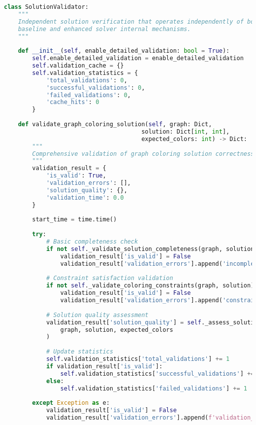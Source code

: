\begin{lstlisting}[language=Python, caption=External Constraint Satisfaction Verification System]
class SolutionValidator:
    """
    Independent solution verification that operates independently of both 
    baseline and enhanced solver internal mechanisms.
    """
    
    def __init__(self, enable_detailed_validation: bool = True):
        self.enable_detailed_validation = enable_detailed_validation
        self.validation_cache = {}
        self.validation_statistics = {
            'total_validations': 0,
            'successful_validations': 0,
            'failed_validations': 0,
            'cache_hits': 0
        }
    
    def validate_graph_coloring_solution(self, graph: Dict, 
                                       solution: Dict[int, int],
                                       expected_colors: int) -> Dict:
        """
        Comprehensive validation of graph coloring solution correctness.
        """
        validation_result = {
            'is_valid': True,
            'validation_errors': [],
            'solution_quality': {},
            'validation_time': 0.0
        }
        
        start_time = time.time()
        
        try:
            # Basic completeness check
            if not self._validate_solution_completeness(graph, solution):
                validation_result['is_valid'] = False
                validation_result['validation_errors'].append('incomplete_solution')
            
            # Constraint satisfaction validation
            if not self._validate_coloring_constraints(graph, solution):
                validation_result['is_valid'] = False
                validation_result['validation_errors'].append('constraint_violation')
            
            # Solution quality assessment
            validation_result['solution_quality'] = self._assess_solution_quality(
                graph, solution, expected_colors
            )
            
            # Update statistics
            self.validation_statistics['total_validations'] += 1
            if validation_result['is_valid']:
                self.validation_statistics['successful_validations'] += 1
            else:
                self.validation_statistics['failed_validations'] += 1
                
        except Exception as e:
            validation_result['is_valid'] = False
            validation_result['validation_errors'].append(f'validation_exception: {str(e)}')
        

\end{lstlisting}
